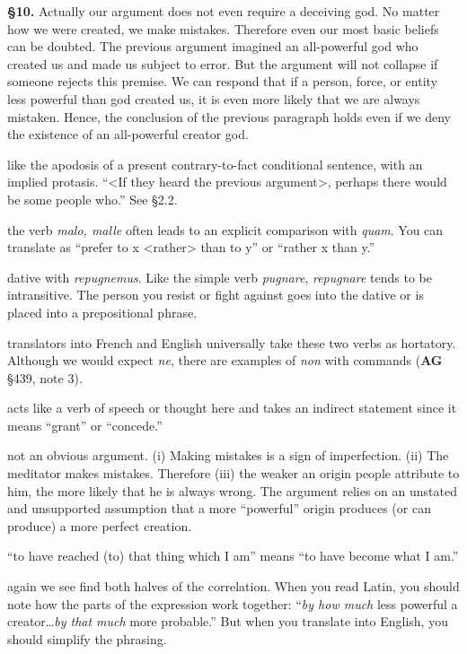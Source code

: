 \prenotes

\textbf{§10.} Actually our argument does not even require a deceiving god. No matter how we were created, we make mistakes. Therefore even our most basic beliefs can be doubted. The previous argument imagined an all-powerful god who created us and made us subject to error. But the argument will not collapse if someone rejects this premise. We can respond that if a person, force, or entity less powerful than god created us, it is even more likely that we are always mistaken. Hence, the conclusion of the previous paragraph holds even if we deny the existence of an all-powerful creator god.

 like the apodosis of a present contrary-to-fact conditional sentence, with an implied protasis. ``<If they heard the previous argument>, perhaps there would be some people who.'' See §2.2.

 the verb \textit{malo, malle} often leads to an explicit comparison with \textit{quam}. You can translate as ``prefer to x <rather> than to y'' or ``rather x than y.''

 dative with \textit{repugnemus}. Like the simple verb \textit{pugnare}, \textit{repugnare} tends to be intransitive. The person you resist or fight against goes into the dative or is placed into a prepositional phrase.

 translators into French and English universally take these two verbs as hortatory. Although we would expect \textit{ne}, there are examples of \textit{non} with commands (\textbf{AG} §439, note 3).

 acts like a verb of speech or thought here and takes an indirect statement since it means ``grant'' or ``concede.''

 not an obvious argument. (i) Making mistakes is a sign of imperfection. (ii) The meditator makes mistakes. Therefore (iii) the weaker an origin people attribute to him, the more likely that he is always wrong. The argument relies on an unstated and unsupported assumption that a more ``powerful'' origin produces (or can produce) a more perfect creation.

 ``to have reached (to) that thing which I am'' means ``to have become what I am.''

 again we see find both halves of the correlation.  When you read Latin, you should note how the parts of the expression work together: ``\textit{by how much} less powerful a creator\dots \textit{by that much} more probable.'' But when you translate into English, you should simplify the phrasing.

